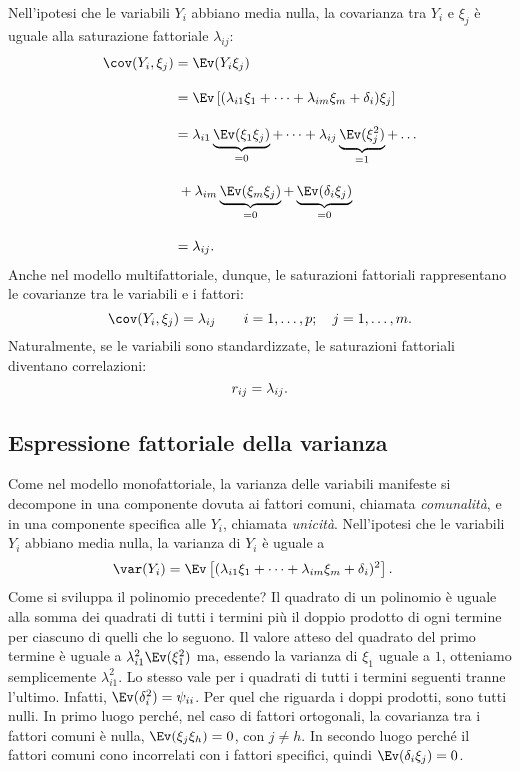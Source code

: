 Nell'ipotesi che le variabili $Y_i$ abbiano media nulla, la covarianza tra $Y_i$ e $\xi_j$ è uguale alla saturazione fattoriale $\lambda_{ij}$:
\begin{align}
  \cov(Y_i, \xi_j) &= \Ev(Y_i \xi_j)\notag\\[10pt]
  &=\Ev\left[(\lambda_{i1} \xi_1 + \dots + \lambda_{im} \xi_m + \delta_i)\xi_j \right]\notag\\[10pt]
  &= \lambda_{i1}\underbrace{\Ev(\xi_1\xi_j)}_{=0} + \dots + 
\lambda_{ij}\underbrace{\Ev(\xi_j^2)}_{=1} + \dots \notag\\[10pt]
& \; + \lambda_{im}\underbrace{\Ev(\xi_m\xi_j)}_{=0} +
  \underbrace{\Ev(\delta_i \xi_j)}_{=0}\notag\\[10pt]
  &= \lambda_{ij}.\notag
\end{align}
\label{eq:cov_multifatt_orto}
Anche nel modello multifattoriale, dunque, le saturazioni fattoriali rappresentano le covarianze tra le variabili e i fattori:
\begin{equation}
  \cov(Y_i, \xi_j) = \lambda_{ij} \qquad i=1, \dots, p; \quad j= 1, \dots, m. \notag
\end{equation} 
Naturalmente, se le variabili sono standardizzate, le saturazioni fattoriali diventano correlazioni:
\begin{equation}
  r_{ij} = \lambda_{ij}. \notag
\end{equation}


\subsection{Espressione fattoriale della varianza}

Come nel modello monofattoriale, la varianza delle variabili manifeste
si decompone in una componente dovuta ai fattori comuni, chiamata
\emph{comunalità}, e in una componente specifica alle $Y_i$, chiamata
\emph{unicità}. 
Nell'ipotesi che le variabili $Y_i$ abbiano media nulla, la varianza 
di $Y_i$ è uguale a
\begin{align}
  \var (Y_i) 
  &=\Ev\left[ (\lambda_{i1} \xi_1 + \dots +
    \lambda_{im} \xi_m + \delta_i)^2 \right].\notag
\end{align}
\label{eq_var_multifatt}
Come si sviluppa il polinomio precedente?
Il quadrato di un polinomio è uguale alla somma dei quadrati di tutti
i termini più il doppio prodotto di ogni termine per ciascuno di
quelli che lo seguono.
 Il valore atteso del quadrato del primo termine
è uguale a $\lambda_{i1}^2\Ev(\xi_1^2)$ ma, essendo la varianza
di $\xi_1$ uguale a $1$, otteniamo semplicemente $\lambda_{i1}^2$. Lo stesso vale per i quadrati di tutti i termini seguenti tranne
l'ultimo. Infatti, $\Ev(\delta_i^2)=\psi_{ii}$. 
Per quel che riguarda i doppi prodotti, sono tutti nulli. In primo luogo perché, nel caso di fattori ortogonali, la covarianza tra i fattori
comuni è nulla, $\Ev(\xi_j \xi_h)=0$,
con $j \neq h$.
In secondo luogo perché il fattori comuni cono
incorrelati con i fattori specifici, quindi $\Ev(\delta_i
\xi_j)=0$.

